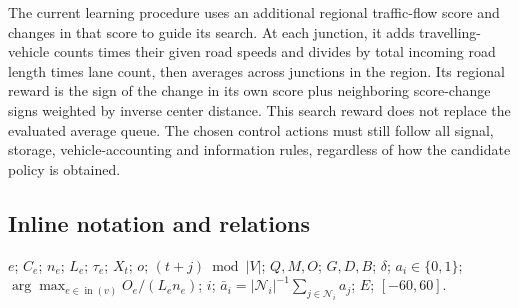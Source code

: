 \documentclass[10pt]{article}
\begin{document}
The current learning procedure uses an additional regional traffic-flow score and changes in that score to guide its search. At each junction, it adds travelling-vehicle counts times their given road speeds and divides by total incoming road length times lane count, then averages across junctions in the region. Its regional reward is the sign of the change in its own score plus neighboring score-change signs weighted by inverse center distance. This search reward does not replace the evaluated average queue. The chosen control actions must still follow all signal, storage, vehicle-accounting and information rules, regardless of how the candidate policy is obtained.

\subsection*{Inline notation and relations}
$e$; $C_e$; $n_e$; $L_e$; $\tau_e$; $X_t$; $o$; $(t+j)\bmod |V|$; $Q,M,O$; $G,D,B$; $\delta$; $a_i\in\{0,1\}$; $\arg\max_{e\in\operatorname{in}(v)}O_e/(L_en_e)$; $i$; $\bar a_i=|\mathcal N_i|^{-1}\sum_{j\in\mathcal N_i}a_j$; $E$; $[-60,60]$.
\end{document}

